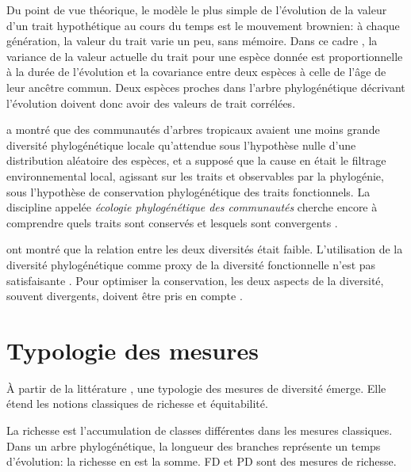 \documentclass[
  11pt,
  french,
  a4paper,
  extrafontsizes,onecolumn,openright
  ]{memoir}
\begin{document}
Du point de vue théorique, le modèle le plus simple de l'évolution de la valeur d'un trait hypothétique au cours du temps est le mouvement brownien: à chaque génération, la valeur du trait varie un peu, sans mémoire.
Dans ce cadre \autocite{Felsenstein1985}, la variance de la valeur actuelle du trait pour une espèce donnée est proportionnelle à la durée de l'évolution et la covariance entre deux espèces à celle de l'âge de leur ancêtre commun.
Deux espèces proches dans l'arbre phylogénétique décrivant l'évolution doivent donc avoir des valeurs de trait corrélées.

\textcite{Webb2000} a montré que des communautés d'arbres tropicaux avaient une moins grande diversité phylogénétique locale qu'attendue sous l'hypothèse nulle d'une distribution aléatoire des espèces, et a supposé que la cause en était le filtrage environnemental local, agissant sur les traits et observables par la phylogénie, sous l'hypothèse de conservation phylogénétique des traits fonctionnels.
La discipline appelée \emph{écologie phylogénétique des communautés} cherche encore à comprendre quels traits sont conservés et lesquels sont convergents \autocite{Cavender-Bares2009}.

\textcite{Swenson2009} ont montré que la relation entre les deux diversités était faible.
L'utilisation de la diversité phylogénétique comme proxy de la diversité fonctionnelle n'est pas satisfaisante \autocite{Pavoine2011}. Pour optimiser la conservation, les deux aspects de la diversité, souvent divergents, doivent être pris en compte \autocite{Devictor2010}.

\section{Typologie des mesures}\label{typologie-des-mesures}

À partir de la littérature \autocite{Ricotta2007,Pavoine2011}, une typologie des mesures de diversité émerge.
Elle étend les notions classiques de richesse et équitabilité.

La richesse est l'accumulation de classes différentes dans les mesures classiques.
Dans un arbre phylogénétique, la longueur des branches représente un temps d'évolution: la richesse en est la somme.
FD et PD sont des mesures de richesse.



\scriptsize
\end{document}
